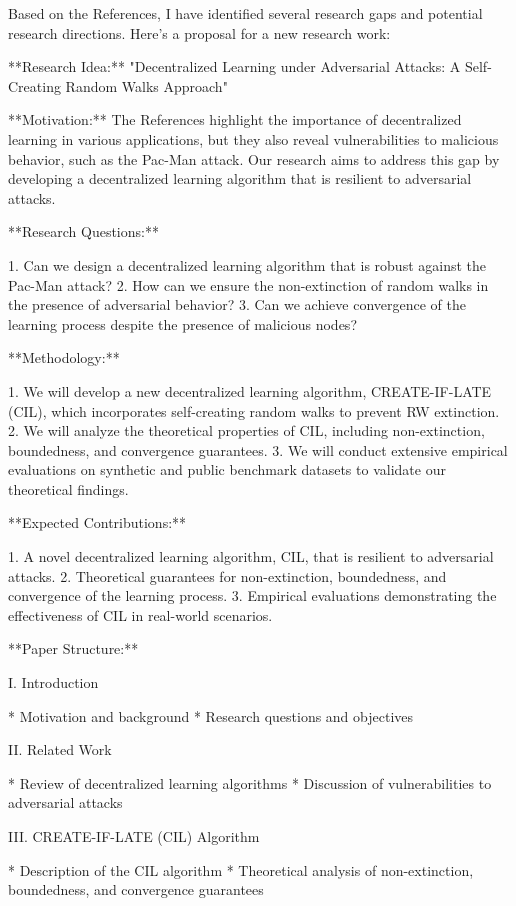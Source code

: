 Based on the References, I have identified several research gaps and potential research directions. Here's a proposal for a new research work:

**Research Idea:** "Decentralized Learning under Adversarial Attacks: A Self-Creating Random Walks Approach"

**Motivation:** The References highlight the importance of decentralized learning in various applications, but they also reveal vulnerabilities to malicious behavior, such as the Pac-Man attack. Our research aims to address this gap by developing a decentralized learning algorithm that is resilient to adversarial attacks.

**Research Questions:**

1. Can we design a decentralized learning algorithm that is robust against the Pac-Man attack?
2. How can we ensure the non-extinction of random walks in the presence of adversarial behavior?
3. Can we achieve convergence of the learning process despite the presence of malicious nodes?

**Methodology:**

1. We will develop a new decentralized learning algorithm, CREATE-IF-LATE (CIL), which incorporates self-creating random walks to prevent RW extinction.
2. We will analyze the theoretical properties of CIL, including non-extinction, boundedness, and convergence guarantees.
3. We will conduct extensive empirical evaluations on synthetic and public benchmark datasets to validate our theoretical findings.

**Expected Contributions:**

1. A novel decentralized learning algorithm, CIL, that is resilient to adversarial attacks.
2. Theoretical guarantees for non-extinction, boundedness, and convergence of the learning process.
3. Empirical evaluations demonstrating the effectiveness of CIL in real-world scenarios.

**Paper Structure:**

I. Introduction

* Motivation and background
* Research questions and objectives

II. Related Work

* Review of decentralized learning algorithms
* Discussion of vulnerabilities to adversarial attacks

III. CREATE-IF-LATE (CIL) Algorithm

* Description of the CIL algorithm
* Theoretical analysis of non-extinction, boundedness, and convergence guarantees

